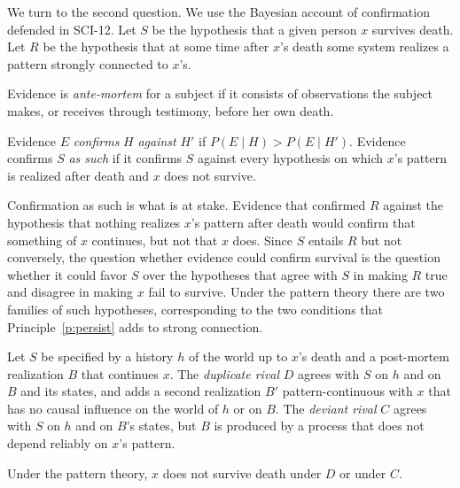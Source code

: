 \documentclass{situationist-preprint}
\begin{document}
We turn to the second question. We use the Bayesian account of confirmation defended in SCI-12. Let $S$ be the hypothesis that a given person $x$ survives death. Let $R$ be the hypothesis that at some time after $x$'s death some system realizes a pattern strongly connected to $x$'s.

\begin{definition}\label{d:ante}
Evidence is \emph{ante-mortem} for a subject if it consists of observations the subject makes, or receives through testimony, before her own death.
\end{definition}

\begin{definition}\label{d:conf}
Evidence $E$ \emph{confirms} $H$ \emph{against} $H'$ if $P(E \mid H) > P(E \mid H')$. Evidence confirms $S$ \emph{as such} if it confirms $S$ against every hypothesis on which $x$'s pattern is realized after death and $x$ does not survive.
\end{definition}

Confirmation as such is what is at stake. Evidence that confirmed $R$ against the hypothesis that nothing realizes $x$'s pattern after death would confirm that something of $x$ continues, but not that $x$ does. Since $S$ entails $R$ but not conversely, the question whether evidence could confirm survival is the question whether it could favor $S$ over the hypotheses that agree with $S$ in making $R$ true and disagree in making $x$ fail to survive. Under the pattern theory there are two families of such hypotheses, corresponding to the two conditions that Principle~\ref{p:persist} adds to strong connection.

\begin{definition}\label{d:rivals}
Let $S$ be specified by a history $h$ of the world up to $x$'s death and a post-mortem realization $B$ that continues $x$. The \emph{duplicate rival} $D$ agrees with $S$ on $h$ and on $B$ and its states, and adds a second realization $B'$ pattern-continuous with $x$ that has no causal influence on the world of $h$ or on $B$. The \emph{deviant rival} $C$ agrees with $S$ on $h$ and on $B$'s states, but $B$ is produced by a process that does not depend reliably on $x$'s pattern.
\end{definition}

\begin{lemma}\label{l:fail}
Under the pattern theory, $x$ does not survive death under $D$ or under $C$.
\end{lemma}
\end{document}
